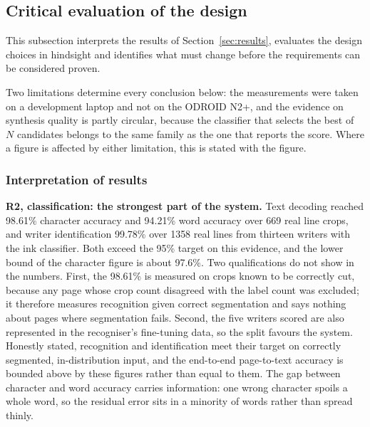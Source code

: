 \label{sec:discussion}

\subsection{Critical evaluation of the design} %

This subsection interprets the results of Section~\ref{sec:results}, evaluates the design choices in hindsight and identifies what must change before the requirements can be considered proven.
\label{sec:dis-critical}

Two limitations determine every conclusion below: the measurements were taken on a development laptop and not on the ODROID N2+, and the evidence on synthesis quality is partly circular, because the classifier that selects the best of $N$ candidates belongs to the same family as the one that reports the score.
Where a figure is affected by either limitation, this is stated with the figure.

    \subsubsection{Interpretation of results}
    \label{sec:dis-interp}

        \textbf{R2, classification: the strongest part of the system.}
        Text decoding reached 98.61\% character accuracy and 94.21\% word accuracy over 669 real line crops, and writer identification 99.78\% over 1358 real lines from thirteen writers with the ink classifier.
        Both exceed the 95\% target on this evidence, and the lower bound of the character figure is about 97.6\%.
        Two qualifications do not show in the numbers.
        First, the 98.61\% is measured on crops known to be correctly cut, because any page whose crop count disagreed with the label count was excluded; it therefore measures recognition given correct segmentation and says nothing about pages where segmentation fails.
        Second, the five writers scored are also represented in the recogniser's fine-tuning data, so the split favours the system.
        Honestly stated, recognition and identification meet their target on correctly segmented, in-distribution input, and the end-to-end page-to-text accuracy is bounded above by these figures rather than equal to them.
        The gap between character and word accuracy carries information: one wrong character spoils a whole word, so the residual error sits in a minority of words rather than spread thinly.

